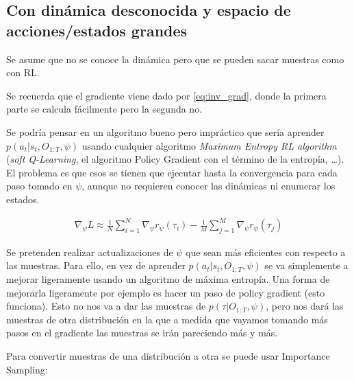 \subsection{Con dinámica desconocida y espacio de acciones/estados grandes}%
\label{sub:con_dinámica_desconocida_y_espacio_de_acciones_estados_grandes}

Se asume que no se conoce la dinámica pero que se pueden sacar muestras como con RL.

Se recuerda que el gradiente viene dado por \ref{eq:inv_grad}, donde la primera parte se
calcula fácilmente pero la segunda no.

Se podría pensar en un algoritmo bueno pero impráctico que sería aprender
$p(a_t|s_t,O_{1:T},\psi)$ usando cualquier algoritmo \textit{Maximum Entropy RL algorithm}
(\textit{soft Q-Learning}, el algoritmo Policy Gradient con el término de la entropía, \ldots).
El problema es que esos se tienen que ejecutar hasta la convergencia para cada paso tomado en
$\psi$, aunque no requieren conocer las dinámicas ni enumerar los estados.

\begin{align}
\nabla _ { \psi } L \approx \frac { 1 } { N } \sum _ { i = 1 } ^ { N } \nabla _ { \psi } r _ { \psi } ( \tau _ { i } ) - \frac { 1 } { M } \sum _ { j = 1 } ^ { M } \nabla _ { \psi } r _ { \psi } ( \tau _ { j } )
\end{align}

Se pretenden realizar actualizaciones de $\psi$ que sean más eficientes con respecto a las
muestras. Para ello, en vez de aprender $p(a_t|s_t,O_{1:T},\psi)$ se va simplemente a
mejorar ligeramente usando un algoritmo de máxima entropía. Una forma de mejorarla
ligeramente por ejemplo es hacer un paso de policy gradient (esto funciona). Esto no nos va a dar
las muestras de $p(\tau|O_{1:T},\psi)$, pero nos dará las muestras de otra distribución en la
que a medida que vayamos tomando más pasos en el gradiente las muestras se irán pareciendo más
y más.

Para convertir muestras de una distribución a otra se puede usar Importance Sampling:

